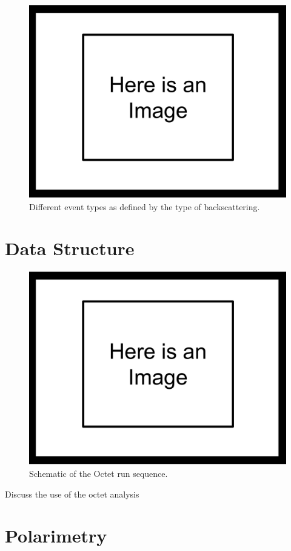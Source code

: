 \begin{figure}[h]
\centering
\includegraphics[scale=.25]{3-UCNAAnalysis/ImageHolder.pdf}
\caption{Different event types as defined by the type of backscattering.}
\end{figure}

\section{Data Structure}

\begin{figure}[h]
\centering
\includegraphics[scale=.25]{3-UCNAAnalysis/ImageHolder.pdf}
\caption{Schematic of the Octet run sequence.}
\end{figure}

Discuss the use of the octet analysis

\section{Polarimetry} \label{sec:polarimetry}







